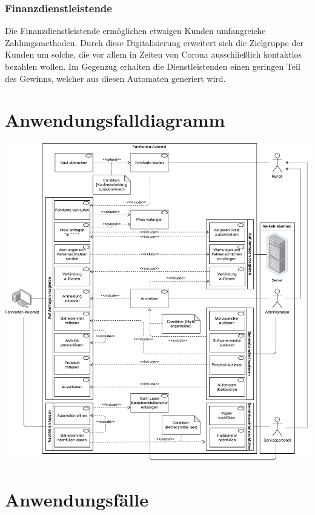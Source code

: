\documentclass{article}
\begin{document}
    \subsubsection*{Finanzdienstleistende}
    \label{sec:Finanzdienstleistende}
    Die \gls{Finanzdienstleistende} ermöglichen etwaigen \gls{Kunden} umfangreiche \gls{Zahlungsmethoden}.
    Durch diese \gls{Digitalisierung} erweitert sich die Zielgruppe der \gls{Kunden} um solche, die vor allem in Zeiten von Corona ausschließlich kontaktlos bezahlen wollen.
    Im Gegenzug erhalten die Dienstleistenden einen geringen Teil des Gewinns, welcher aus diesen Automaten generiert wird.

    \section{Anwendungsfalldiagramm}
    \includegraphics[width=\textwidth]{swt_wende_tim_h03_use_case.pdf}

    \section{Anwendungsfälle}
\end{document}
